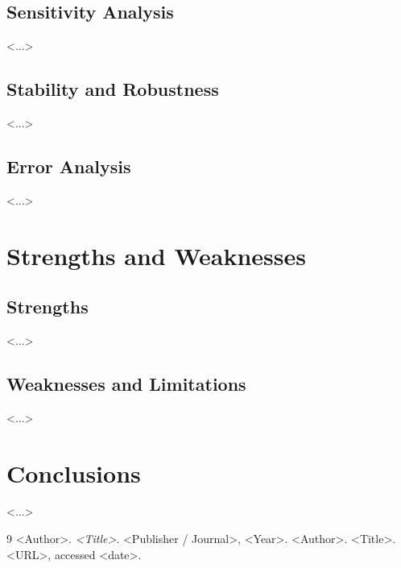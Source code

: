\documentclass[12pt]{article}            %
\theoremstyle{definition}
\theoremstyle{remark}
\begin{document}
\subsection{Sensitivity Analysis}
<...>

\subsection{Stability and Robustness}
<...>

\subsection{Error Analysis}
<...>

\section{Strengths and Weaknesses}
\subsection{Strengths}
<...>
\subsection{Weaknesses and Limitations}
<...>

\section{Conclusions}
<...>

\begin{thebibliography}{9}
 <Author>. \textit{<Title>}. <Publisher / Journal>, <Year>.
 <Author>. <Title>. <URL>, accessed <date>.
\end{thebibliography}
\end{document}
